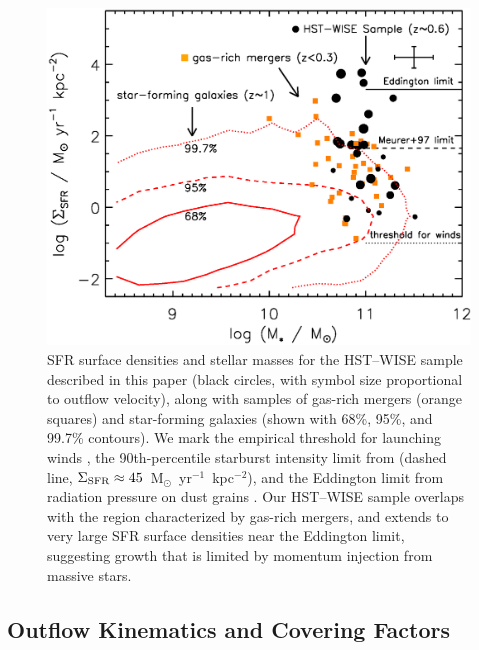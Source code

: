 \documentclass[apj]{emulateapj}
\newcommand{\units}{M$_{\odot}$~yr$^{-1}$~kpc$^{-2}$}
\newcommand{\sigmasfr}{\Sigma_{\textnormal{\scriptsize{SFR}}}}
\begin{document}
\begin{figure}[!t]
\begin{center}
\includegraphics[angle=0,scale=.8]{sigmasfr.ps} 
\caption{SFR surface densities and stellar masses for the HST--WISE
  sample described in this paper (black circles, with symbol size
  proportional to outflow velocity), along with samples of gas-rich
  mergers (orange squares) and star-forming galaxies (shown with 68\%,
  95\%, and 99.7\% contours).  We mark the empirical threshold for
  launching winds \citep[dotted line,
    $\sigmasfr\approx0.1$~\units;][]{hec02}, the 90th-percentile
  starburst intensity limit from \citet{meu97} (dashed line,
  $\sigmasfr\approx45$~\units), and the Eddington limit from radiation
  pressure on dust grains \citep[solid line,
    $\sigmasfr\approx2000$~\units;][]{mur05,tho05,hop10}.  Our
  HST--WISE sample overlaps with the region characterized by gas-rich
  mergers, and extends to very large SFR surface densities near the
  Eddington limit, suggesting growth that is limited by momentum
  injection from massive stars.}
\label{fig:sigmasfr}
\end{center}
\end{figure}

\subsection{Outflow Kinematics and Covering Factors}
\end{document}
